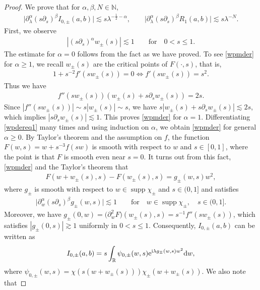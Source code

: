 \documentclass[pdftex]{sigma}
\numberwithin{equation}{section}
\def\R{\mathbb{R}}%
\DeclareMathOperator{\supp}{supp}%
\def\a{\alpha}
\def\b{\beta}
\def\g{\psi}
\def\l{\lambda}
\def\pa{\partial}
\begin{document}
\begin{proof}
We prove that for $\a,\b,N\in\mathbb{N}$,
\begin{align}\label{I0abest}
\big|\pa_{\l}^{\a}(s\pa_{s})^{\b}I_{0,\pm}(a,b)\big|\lesssim s\l^{-\frac{1}{2}-\a},\qquad \big|\pa_{\l}^{\a}(s\pa_{s})^{\b}R_1(a,b)\big|\lesssim s\l^{-N}.
\end{align}
First, we observe
\begin{align}\label{wpmder}
|(s\pa_s)^{\a}w_{\pm}(s)|\lesssim 1\qquad \text{for}\quad 0<s\leq 1.
\end{align}
The estimate for $\a=0$ follows from the fact  as we have proved.
To see \eqref{wpmder} for $\a\geq 1$, we recall $w_{\pm}(s)$ are the critical points of $F(\cdot,s)$, that is,
\begin{align*}
1+s^{-2}f'(sw_{\pm}(s))=0\Leftrightarrow f'(sw_{\pm}(s))=s^2.
\end{align*}
Thus we have
\begin{align}\label{wpdereq1}
f''(sw_{\pm}(s))(w_{\pm}(s)+s\pa_sw_{\pm}(s))=2s.
\end{align}
Since $|f''(sw_{\pm}(s))|\sim s|w_{\pm}(s)|\sim s$, we have $s|w_{\pm}(s)+s\pa_sw_{\pm}(s)|\lesssim 2s$, which implies $|s\pa_sw_{\pm}(s)|\allowbreak\lesssim 1$. This proves \eqref{wpmder} for $\a=1$. Differentiating \eqref{wpdereq1} many times and using induction on $\a$, we obtain \eqref{wpmder} for general $\a\geq 0$. By Taylor's theorem and the assumption on $f$, the function~${F(w,s)=w+s^{-3}f(sw)}$ is smooth with respect to $w$ and $s\in [0,1]$, where the point is that $F$ is smooth even near $s=0$. It turns out from this fact, \eqref{wpmder} and the Taylor's theorem that
\begin{align*}
F(w+w_{\pm}(s),s)-F(w_{\pm}(s),s)=g_{\pm}(w,s)w^2,
\end{align*}
where $g_{\pm}$ is smooth with respect to $w\in \supp \chi_{\pm}$ and $s\in (0,1]$ and satisfies
\begin{align*}
\big|\pa_w^{\a}(s\pa_s)^{\b}g_{\pm}(w,s)\big|\lesssim 1\qquad \text{for}\quad w\in \supp \chi_{\pm},\quad s\in (0,1].
\end{align*}
Moreover, we have $g_{\pm}(0,w)=\bigl(\pa_w^2F\bigr)(w_{\pm}(s),s)=s^{-1}f''(sw_{\pm}(s))$, which satisfies $|g_{\pm}(0,s)|\gtrsim 1$ uniformly in $0<s\leq 1$. Consequently, $I_{0,\pm}(a,b)$ can be written as
\begin{align*}
I_{0,\pm}(a,b)=s\int_{\R}\g_{0,\pm}(w,s){\rm e}^{{\rm i}\l g_{\pm}(w,s)w^2}{\rm d}w,
\end{align*}
where $\g_{0,\pm}(w,s)=\chi(s(w+w_{\pm}(s)))\chi_{\pm}(w+w_{\pm}(s))$. We also note that

\end{proof}
\end{document}
